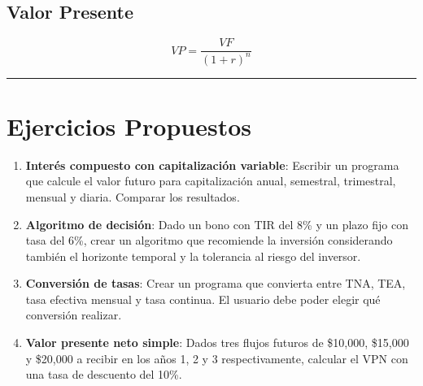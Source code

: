 \documentclass[
  spanish,
  letterpaper,
  DIV=11,
  numbers=noendperiod]{scrreprt}
\newenvironment{Shaded}{\begin{snugshade}}{\end{snugshade}}
\newcommand{\NormalTok}[1]{\textcolor[rgb]{0.00,0.23,0.31}{#1}}
\begin{document}
\subsection{Valor Presente}\label{valor-presente}

\[VP = \frac{VF}{(1 + r)^n}\]

\begin{Shaded}
\end{Shaded}

\begin{center}\rule{0.5\linewidth}{0.5pt}\end{center}

\section{Ejercicios Propuestos}\label{ejercicios-propuestos}

\begin{tcolorbox}[enhanced jigsaw, bottomrule=.15mm, colback=white, opacitybacktitle=0.6, arc=.35mm, toprule=.15mm, opacityback=0, breakable, titlerule=0mm, left=2mm, coltitle=black, colbacktitle=quarto-callout-important-color!10!white, colframe=quarto-callout-important-color-frame, leftrule=.75mm, toptitle=1mm, bottomtitle=1mm, title=\textcolor{quarto-callout-important-color}{\faExclamation}\hspace{0.5em}{Ejercicios}, rightrule=.15mm]

\begin{enumerate}
\def\labelenumi{\arabic{enumi}.}
\item
  \textbf{Interés compuesto con capitalización variable}: Escribir un
  programa que calcule el valor futuro para capitalización anual,
  semestral, trimestral, mensual y diaria. Comparar los resultados.
\item
  \textbf{Algoritmo de decisión}: Dado un bono con TIR del 8\% y un
  plazo fijo con tasa del 6\%, crear un algoritmo que recomiende la
  inversión considerando también el horizonte temporal y la tolerancia
  al riesgo del inversor.
\item
  \textbf{Conversión de tasas}: Crear un programa que convierta entre
  TNA, TEA, tasa efectiva mensual y tasa continua. El usuario debe poder
  elegir qué conversión realizar.
\item
  \textbf{Valor presente neto simple}: Dados tres flujos futuros de
  \$10,000, \$15,000 y \$20,000 a recibir en los años 1, 2 y 3
  respectivamente, calcular el VPN con una tasa de descuento del 10\%.
\end{enumerate}

\end{tcolorbox}
\end{document}
